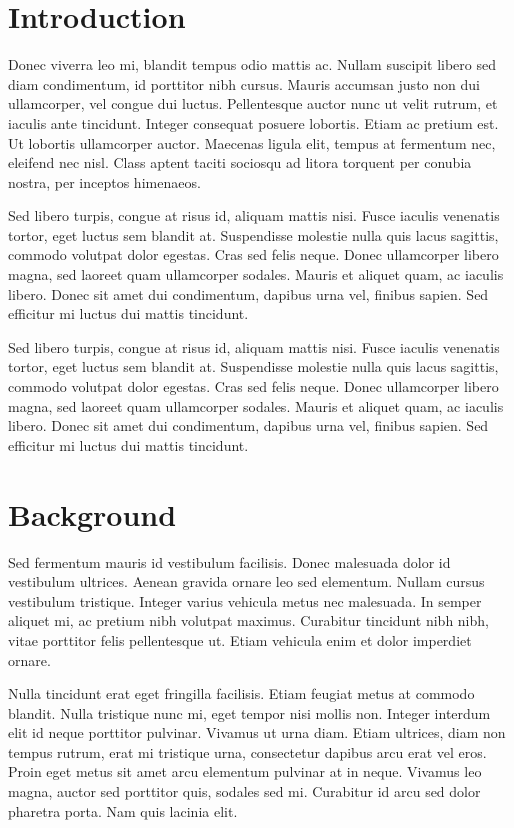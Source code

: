 \documentclass[12pt]{article}
\begin{document}
\begin{multicols*}{2}

\section{Introduction} \label{intro}
Donec viverra leo mi, blandit tempus odio mattis ac. Nullam suscipit libero sed diam condimentum, id porttitor nibh cursus. Mauris accumsan justo non dui ullamcorper, vel congue dui luctus. Pellentesque auctor nunc ut velit rutrum, et iaculis ante tincidunt. Integer consequat posuere lobortis. Etiam ac pretium est. Ut lobortis ullamcorper auctor. Maecenas ligula elit, tempus at fermentum nec, eleifend nec nisl. Class aptent taciti sociosqu ad litora torquent per conubia nostra, per inceptos himenaeos.

Sed libero turpis, congue at risus id, aliquam mattis nisi. Fusce iaculis venenatis tortor, eget luctus sem blandit at. Suspendisse molestie nulla quis lacus sagittis, commodo volutpat dolor egestas. Cras sed felis neque. Donec ullamcorper libero magna, sed laoreet quam ullamcorper sodales. Mauris et aliquet quam, ac iaculis libero. Donec sit amet dui condimentum, dapibus urna vel, finibus sapien. Sed efficitur mi luctus dui mattis tincidunt.

Sed libero turpis, congue at risus id, aliquam mattis nisi. Fusce iaculis venenatis tortor, eget luctus sem blandit at. Suspendisse molestie nulla quis lacus sagittis, commodo volutpat dolor egestas. Cras sed felis neque. Donec ullamcorper libero magna, sed laoreet quam ullamcorper sodales. Mauris et aliquet quam, ac iaculis libero. Donec sit amet dui condimentum, dapibus urna vel, finibus sapien. Sed efficitur mi luctus dui mattis tincidunt.

\section{Background} \label{complexity_explaintion}
Sed fermentum mauris id vestibulum facilisis. Donec malesuada dolor id vestibulum ultrices. Aenean gravida ornare leo sed elementum. Nullam cursus vestibulum tristique. Integer varius vehicula metus nec malesuada. In semper aliquet mi, ac pretium nibh volutpat maximus. Curabitur tincidunt nibh nibh, vitae porttitor felis pellentesque ut. Etiam vehicula enim et dolor imperdiet ornare.

Nulla tincidunt erat eget fringilla facilisis. Etiam feugiat metus at commodo blandit. Nulla tristique nunc mi, eget tempor nisi mollis non. Integer interdum elit id neque porttitor pulvinar. Vivamus ut urna diam. Etiam ultrices, diam non tempus rutrum, erat mi tristique urna, consectetur dapibus arcu erat vel eros. Proin eget metus sit amet arcu elementum pulvinar at in neque. Vivamus leo magna, auctor sed porttitor quis, sodales sed mi. Curabitur id arcu sed dolor pharetra porta. Nam quis lacinia elit.


\end{multicols*}
\end{document}
